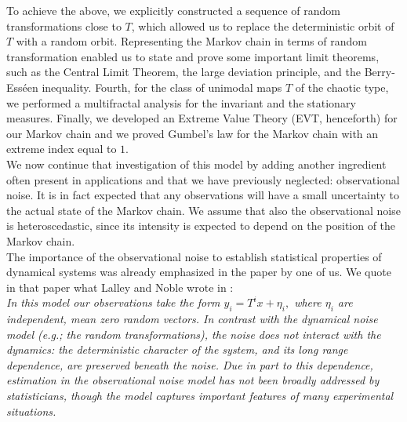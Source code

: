 \documentclass{article}
\newcommand{\1}{\mathbbm{1}}
\begin{document}
To achieve the above, we 
explicitly constructed a sequence of random transformations close to $T$, which allowed us to
replace the deterministic orbit of $T$ with a random orbit.  Representing the Markov chain in terms of
random transformation enabled us to state and prove some important limit theorems, such
as the Central Limit Theorem, the large deviation principle, and the Berry-Ess\'een inequality. Fourth, for the class of unimodal maps $T$ of the chaotic type, we performed a multifractal
analysis for the invariant and the stationary measures. Finally, we developed an Extreme Value
Theory (EVT, henceforth) for our Markov chain and we  proved Gumbel’s law for the Markov chain with an extreme index equal to $1$.\\

We now continue that investigation of this model by adding another ingredient often present in applications and that we have previously neglected: observational noise. It is in fact expected that any observations will have a small uncertainty to the actual state of the Markov chain. We assume that also the observational noise is heteroscedastic, since its intensity is expected to depend on the position of the Markov chain. \\ 

The importance of the observational noise to establish statistical properties of dynamical systems was already emphasized in the paper \cite{FV} by one of us. We quote in that paper what  Lalley and Noble wrote in \cite{LN}:\\
{\em In this model our observations take the form $y_i = T^ix+\eta_i,$
where $\eta_i$ are independent, mean zero random vectors. In contrast
with the dynamical noise model (e.g.; the random transformations), the noise does not interact with the dynamics: the deterministic character of the system, and its long range dependence,
are preserved beneath the noise. Due in part to this dependence,
estimation in the observational noise model has not been broadly
addressed by statisticians, though the model captures important
features of many experimental situations.}\\

\end{document}
